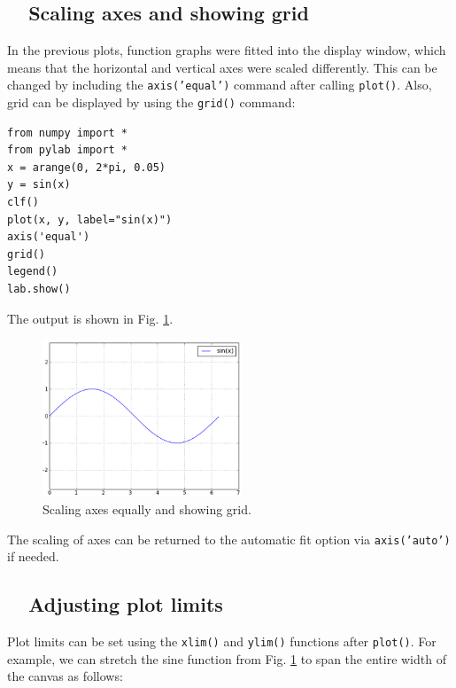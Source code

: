 \subsection{\ \ Scaling axes and showing grid}

In the previous plots, function graphs were fitted into the 
display window, which means that the horizontal and vertical 
axes were scaled differently. This can be changed by including the 
{\tt axis('equal')} command after calling {\tt plot()}. Also, 
grid can be displayed by using the {\tt grid()} command:

\begin{verbatim}
from numpy import *
from pylab import *
x = arange(0, 2*pi, 0.05)
y = sin(x)
clf()
plot(x, y, label="sin(x)")
axis('equal')
grid()
legend()
lab.show()
\end{verbatim}
\noindent
The output is shown in Fig. \ref{fig:plot8}.
\newpage

\begin{figure}[!ht]
\begin{center}
\includegraphics[width=0.53\textwidth]{imgp/plot8.png}
\end{center}
\vspace{-4mm}
\caption{Scaling axes equally and showing grid.}
\label{fig:plot8}
\vspace{-2mm}
\end{figure}
\noindent
The scaling of axes can be returned to the automatic fit option via
{\tt axis('auto')} if needed.

\subsection{\ \ Adjusting plot limits}

Plot limits can be set using the {\tt xlim()} and {\tt ylim()}
functions after {\tt plot()}. For example, we can stretch the sine
function from Fig. \ref{fig:plot8} to span the entire width of the 
canvas as follows:

